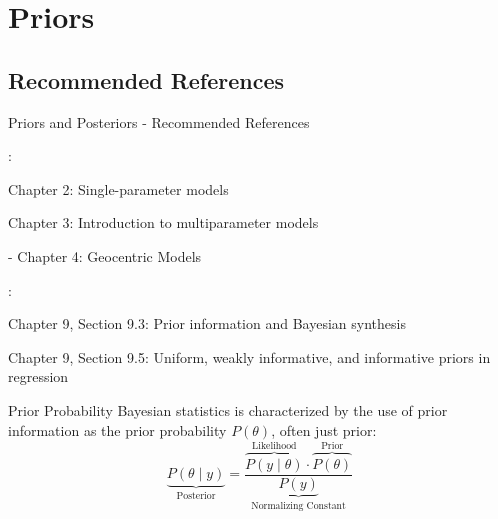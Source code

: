 
\section{Priors}

\subsection{Recommended References}
\begin{frame}{Priors and Posteriors - Recommended References}
	\begin{vfilleditems}
		\item \textcite{gelman2013bayesian}:
		\begin{vfilleditems}
			\item Chapter 2: Single-parameter models
			\item Chapter 3: Introduction to multiparameter models
		\end{vfilleditems}
		\item \textcite{mcelreath2020statistical} - Chapter 4: Geocentric Models
		\item \textcite{gelman2020regression}:
		\begin{vfilleditems}
			\item Chapter 9, Section 9.3: Prior information and Bayesian synthesis
			\item Chapter 9, Section 9.5: Uniform, weakly informative, and informative priors in regression
		\end{vfilleditems}
		\item \textcite{vandeschootBayesianStatisticsModelling2021}
	\end{vfilleditems}
\end{frame}

\begin{frame}{Prior Probability }
	Bayesian statistics is characterized by the use of prior information
	as the prior probability $P(\theta)$, often just prior:
	$$
		\underbrace{P(\theta \mid y)}_{\text{Posterior}} = \frac{\overbrace{P(y \mid  \theta)}^{\text{Likelihood}} \cdot \overbrace{P(\theta)}^{\text{Prior}}}{\underbrace{P(y)}_{\text{Normalizing Constant}}}
	$$
\end{frame}

